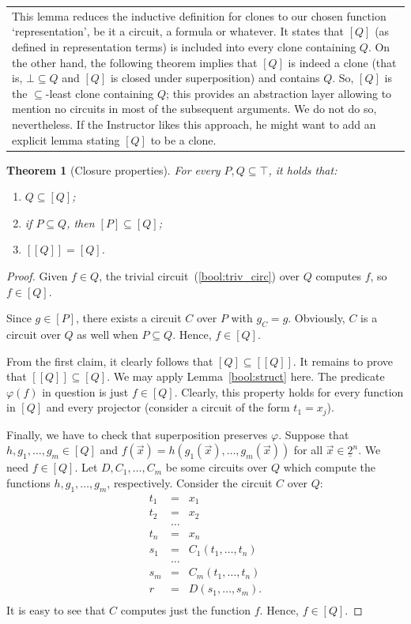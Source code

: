 \documentclass[12pt,notitlepage]{article}
\theoremstyle{plain}
\newtheorem{thm}{Theorem}[section]
\theoremstyle{definition}
\theoremstyle{plain}
\newcommand{\sbs}{\subseteq}
\renewcommand{\phi}{\varphi}
\newcommand{\ul}[1]{\underline{#1}}
\newcommand{\1}{\mathbf{1}}
\newcommand{\0}{\mathbf{0}}
\newcommand{\mcomm}[1]{
\medskip\noindent\begin{tabular}{| l}
\parbox{0.99\textwidth}{{\small
#1 }}\end{tabular}
\smallskip}
\begin{document}
\mcomm{This lemma reduces the inductive definition for clones to our chosen function `representation', be it a circuit, a formula or whatever. It states that $[Q]$ (as defined in representation terms) is included into every clone containing $Q$. On the other hand, the following theorem implies that $[Q]$ is indeed a clone (that is, $\bot \sbs Q$ and $[Q]$ is closed under superposition) and contains $Q$. So, $[Q]$ is the ${\sbs}$-least clone containing $Q$; this provides an abstraction layer allowing to mention no circuits in most of the subsequent arguments. We do not do so, nevertheless. If the Instructor likes this approach, he might want to add an explicit lemma stating $[Q]$ to be a clone.}
\begin{thm}[Closure properties]\label{bool:closure}
For every $P, Q \sbs \top$, it holds that:
\begin{enumerate}
\item $Q \sbs [Q]$;
\item if $P \sbs Q$, then $[P] \sbs [Q]$;
\item $[[Q]] = [Q]$.
\end{enumerate}
\end{thm}
\begin{proof}
Given $f \in Q$, the trivial circuit~(\ref{bool:triv_circ}) over $Q$ computes $f$, so $f \in [Q]$.

Since $g \in [P]$, there exists a circuit $C$ over $P$ with $g_C = g$. Obviously, $C$ is a circuit over $Q$ as well when $P \sbs Q$. Hence, $f \in [Q]$.

From the first claim, it clearly follows that $[Q] \sbs [[Q]]$. It remains to prove that $[[Q]] \sbs [Q]$. We may apply Lemma~\ref{bool:struct} here. The predicate $\phi(f)$ in question is just $f \in [Q]$. Clearly, this property holds for every function in $[Q]$ and every projector (consider a circuit of the form $t_1 = x_j$).

Finally, we have to check that superposition preserves $\phi$. Suppose that $h, g_1, \ldots, g_m \in [Q]$ and $f(\vec x) = h(g_1(\vec x),\ldots, g_m(\vec x))$ for all $\vec x \in \ul{2}^n$. We need $f \in [Q]$. Let $D, C_1, \ldots, C_m$ be some circuits over $Q$ which compute the functions $h, g_1, \ldots, g_m$, respectively. Consider the circuit $C$ over $Q$:
$$
\begin{array}{rcl}
t_1 &=& x_1\\
t_2 &=& x_2\\
&\ldots&\\
t_n &=& x_n\\
s_1 &=& C_1(t_1, \ldots, t_n)\\
&\ldots&\\
s_m &=& C_m(t_1, \ldots, t_n)\\
r &=& D(s_1,\ldots,s_m).\\
\end{array}
$$
It is easy to see that $C$ computes just the function $f$. Hence, $f \in [Q]$.
\end{proof}
\end{document}
